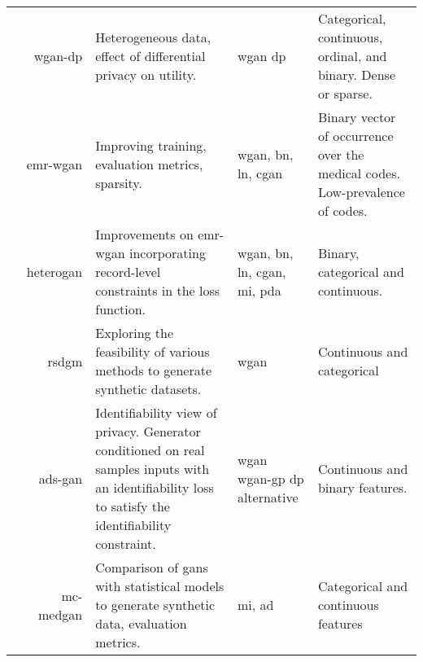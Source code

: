 \begin{center}
\begin{longtable}[l]{@{}p{}Rp{0.25\textwidth}Mp{0.20\textwidth}@{}}
        \citeauthor{chincheong2020generation} & \gls{wgan-dp}
        & Heterogeneous data, effect of differential privacy on utility.  & \gls{wgan} \gls{dp}
        & Categorical, continuous,  ordinal, and binary. Dense or sparse.\\
        
        \citeauthor{Zhang2020} & \gls{emr-wgan}
        & Improving training, evaluation metrics, sparsity. & \gls{wgan}, \gls{bn}, \gls{ln}, \gls{cgan}
        & Binary vector of occurrence over the medical codes. Low-prevalence of codes. \\
        
        \citeauthor{yan2020generating} & \gls{heterogan}
        & Improvements on \gls{emr-wgan} incorporating record-level constraints in the loss function.  & \gls{wgan}, \gls{bn}, \gls{ln}, \gls{cgan}, \gls{mi}, \gls{pda}
        & Binary, categorical and continuous.\\
        
        \citeauthor{ozyigit2020generation} & \gls{rsdgm}
        & Exploring the feasibility of various methods to generate synthetic datasets.  & \gls{wgan}
        & Continuous and categorical\\
        
        \citeauthor{Yoon2020-anon} & \gls{ads-gan}
        & Identifiability view of privacy. Generator conditioned on real samples inputs with an identifiability loss to satisfy the identifiability constraint.  & \gls{wgan} \gls{wgan-gp} \gls{dp} alternative
        & Continuous and binary features.\\
        
        \citeauthor{Goncalves2020} & \gls{mc-medgan}
        & Comparison of \glspl{gan} with statistical models to generate synthetic data, evaluation metrics.  & \gls{mi}, \gls{ad}
        & Categorical and continuous features\\
           
        \hline
        
    \end{longtable}
\end{center}
